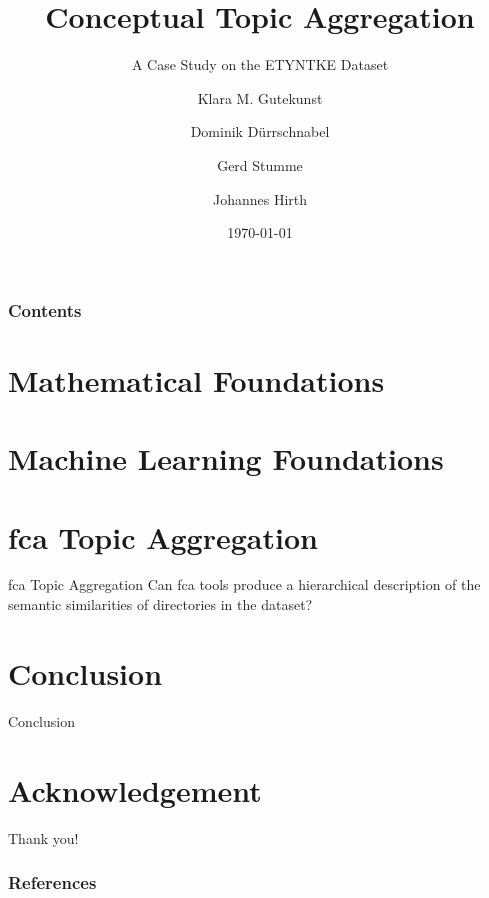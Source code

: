 \documentclass[10pt]{beamer}
\title[\university{}]{Conceptual Topic Aggregation}
\subtitle{A Case Study on the ETYNTKE Dataset}
\author[Klara M. Gutekunst]{Klara M. Gutekunst \and Dominik Dürrschnabel \and Gerd Stumme \and Johannes Hirth}
\institute[klara.gutekunst@uni-kassel.de]{\university{}}
\date[\today]
{\today}
\begin{document}

\frame{\titlepage}
\begin{frame}
\frametitle{Contents}
\tableofcontents
\end{frame}



\section{Mathematical Foundations}



\section{Machine Learning Foundations}





\section{\acs{fca} Topic Aggregation}
    \begin{frame}{\acs{fca} Topic Aggregation}
    Can \acs{fca} tools produce a hierarchical description of the semantic similarities of directories in the dataset?
    \end{frame}



\section{Conclusion}
    \begin{frame}{Conclusion}
    \end{frame}



\section*{Acknowledgement}  
\begin{frame}
\textcolor{myNewColorA}{\Huge{\centerline{Thank you!}}}
\end{frame}


\begin{frame}[allowframebreaks]
\frametitle{References}
\printbibliography
\end{frame}



\end{document}
